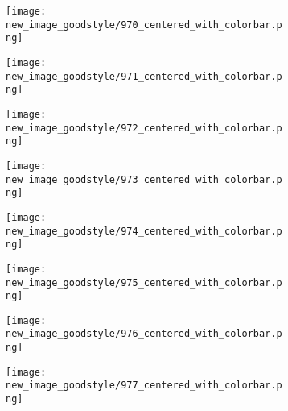 \documentclass[a4paper,12pt]{article}
\begin{document}
\begin{figure}[H]
  \begin{subfigure}{0.11\textwidth}
    \texttt{[image: new\_image\_goodstyle/970\_centered\_with\_colorbar.png]}
  \end{subfigure}
  \hfill
  \begin{subfigure}{0.11\textwidth}
    \texttt{[image: new\_image\_goodstyle/971\_centered\_with\_colorbar.png]}
  \end{subfigure}
  \hfill
  \begin{subfigure}{0.11\textwidth}
    \texttt{[image: new\_image\_goodstyle/972\_centered\_with\_colorbar.png]}
  \end{subfigure}
  \hfill
  \begin{subfigure}{0.11\textwidth}
    \texttt{[image: new\_image\_goodstyle/973\_centered\_with\_colorbar.png]}
  \end{subfigure}
  \hfill
  \begin{subfigure}{0.11\textwidth}
    \texttt{[image: new\_image\_goodstyle/974\_centered\_with\_colorbar.png]}
  \end{subfigure}
  \hfill
  \begin{subfigure}{0.11\textwidth}
    \texttt{[image: new\_image\_goodstyle/975\_centered\_with\_colorbar.png]}
  \end{subfigure}
  \hfill
  \begin{subfigure}{0.11\textwidth}
    \texttt{[image: new\_image\_goodstyle/976\_centered\_with\_colorbar.png]}
  \end{subfigure}
  \hfill
  \begin{subfigure}{0.11\textwidth}
    \texttt{[image: new\_image\_goodstyle/977\_centered\_with\_colorbar.png]}
  \end{subfigure}
  \hfill
\end{figure}
\end{document}
